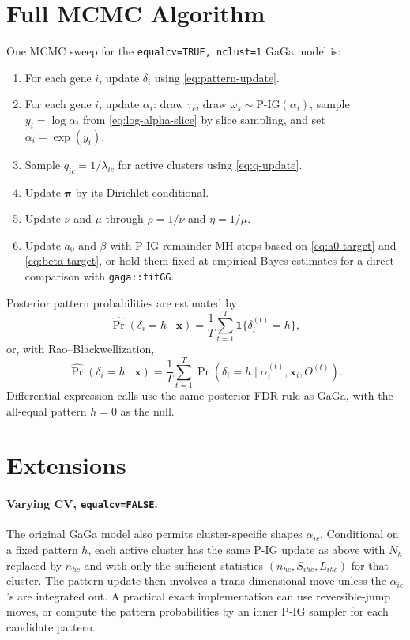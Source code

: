 \documentclass[11pt]{article}
\newcommand{\PIG}{\mathrm{P\mbox{-}IG}}
\begin{document}
\section{Full MCMC Algorithm}

One MCMC sweep for the \texttt{equalcv=TRUE, nclust=1} GaGa model is:
\begin{enumerate}[label=\arabic*.]
  \item For each gene \(i\), update \(\delta_i\) using
        \eqref{eq:pattern-update}.
  \item For each gene \(i\), update \(\alpha_i\):
        draw \(\tau_c\), draw \(\omega_s\sim\PIG(\alpha_i)\), sample
        \(y_i=\log\alpha_i\) from \eqref{eq:log-alpha-slice} by slice
        sampling, and set \(\alpha_i=\exp(y_i)\).
  \item Sample \(q_{ic}=1/\lambda_{ic}\) for active clusters using
        \eqref{eq:q-update}.
  \item Update \(\bm\pi\) by its Dirichlet conditional.
  \item Update \(\nu\) and \(\mu\) through \(\rho=1/\nu\) and
        \(\eta=1/\mu\).
  \item Update \(a_0\) and \(\beta\) with P-IG remainder-MH steps based on
        \eqref{eq:a0-target} and \eqref{eq:beta-target}, or hold them fixed
        at empirical-Bayes estimates for a direct comparison with
        \texttt{gaga::fitGG}.
\end{enumerate}

Posterior pattern probabilities are estimated by
\[
  \widehat{\Pr}(\delta_i=h\mid\bm x)
  =
  \frac{1}{T}\sum_{t=1}^T
  \mathbf{1}\{\delta_i^{(t)}=h\},
\]
or, with Rao--Blackwellization,
\[
  \widehat{\Pr}(\delta_i=h\mid\bm x)
  =
  \frac{1}{T}\sum_{t=1}^T
  \Pr(\delta_i=h\mid \alpha_i^{(t)},\bm x_i,\Theta^{(t)}).
\]
Differential-expression calls use the same posterior FDR rule as GaGa, with
the all-equal pattern \(h=0\) as the null.

\section{Extensions}

\paragraph{Varying CV, \texttt{equalcv=FALSE}.}
The original GaGa model also permits cluster-specific shapes
\(\alpha_{ic}\).  Conditional on a fixed pattern \(h\), each active cluster
has the same P-IG update as above with \(N_h\) replaced by \(n_{hc}\) and with
only the sufficient statistics \((n_{hc},S_{ihc},L_{ihc})\) for that cluster.
The pattern update then involves a trans-dimensional move unless the
\(\alpha_{ic}\)'s are integrated out.  A practical exact implementation can
use reversible-jump moves, or compute the pattern probabilities by an inner
P-IG sampler for each candidate pattern.
\end{document}
